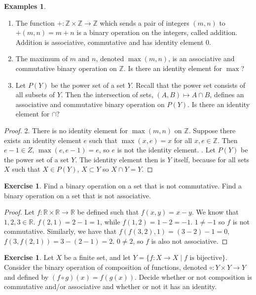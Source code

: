 \documentclass[12pt]{article}
\newcommand{\bbR}{\mathbb{R}}
\newcommand{\bbZ}{\mathbb{Z}}
\providecommand{\arr}{\longrightarrow}
\renewcommand{\_}[1]{\underline{ #1 }}
\theoremstyle{definition}
\newtheorem{exercise}[theorem]{Exercise}
\newtheorem{examples}[theorem]{Examples}
\numberwithin{equation}{subsection}
\begin{document}
\begin{examples}  \hspace{1in}
\begin{enumerate}
\item  The function $+ \colon \bbZ \times \bbZ \arr \bbZ$ which sends a pair of integers $(m, n)$ to $+(m, n) = m + n$ is a binary operation on the integers, called addition.  Addition is associative, commutative and has identity element $0$.

\item  The maximum of $m$ and $n$, denoted $\max(m, n)$, is an associative and commutative binary operation on $\bbZ$.  Is there an identity element for $\max$?

\item  Let $P(Y)$ be the power set of a set $Y$.  Recall that the power set consists of all subsets of $Y$.  Then the intersection of sets, $(A, B) \mapsto A \cap B$, defines an associative and commutative binary operation on $P(Y)$.  Is there an identity element for $\cap$?
\end{enumerate}
\end{examples}

\begin{proof}
2. There is no identity element for $\max(m, n)$ on $\bbZ$. Suppose there exists an identity element $e$ such that $\max(x, e) = x$ for all $x,e \in \bbZ$. Then $e - 1 \in Z$, $\max(e, e-1) = e$, so $e$ is not the identity element. . Let $P(Y)$ be the power set of a set $Y$. The identity element then is $Y$ itself, because for all sets $X$ such that $X \in P(Y)$, $X \subset Y$ so $X \cap Y = Y$.
\end{proof}

\begin{exercise}  
Find a binary operation on a set that is not commutative.  
Find a binary operation on a set that is not associative.
\end{exercise}

\begin{proof}
Let $f : \bbR \times \bbR \to \bbR$ be defined such that $f(x, y) = x - y$. We know that $1,2,3 \in \bbR$. $f(2, 1) = 2 - 1 = 1$, while $f(1, 2) = 1 - 2 = -1$. $1 \not = -1$ so $f$ is not commutative. Similarly, we have that $f(f(3,2),1) = (3 - 2) - 1 = 0$, $f(3, f(2,1)) = 3 - (2 - 1) = 2$. $0 \not = 2$, so $f$ is also not associative.
\end{proof}

\begin{exercise}
Let $X$ be a finite set, and let $Y=\{f:X\arr X\mid \mbox{$f$ is bijective}\}$.  Consider the
binary operation of composition of functions, denoted $\circ:Y\times Y\arr Y$ and defined by 
$(f\circ g)(x)=f(g(x))$.  Decide whether or not composition is commutative and/or associative
and whether or not it has an identity.
\end{exercise}
\end{document}
